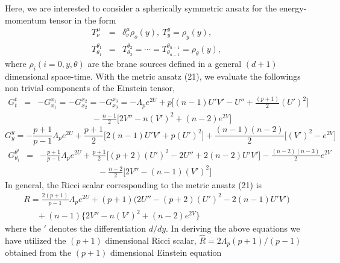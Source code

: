\documentclass[a4paper,12pt]{article}
\newcommand {\nn} {\nonumber}
\begin{document}
Here, we are interested to consider a spherically symmetric ansatz 
for the energy-momentum tensor in the form
\begin{eqnarray}
T^\mu_\nu &=& \delta^\mu_\nu\rho_o(y),~ T_y^y =\rho_y(y),~ \nn\\
T^{\theta_1}_{\theta_1} &=& T^{\theta_2}_{\theta_2} = \cdots =
T^{\theta_{n-1}}_{\theta_{n-1}} = \rho_\theta(y),
\end{eqnarray}
where $\rho_i (i=0,y,\theta)$ are the brane sources defined in a general 
$(d+1)$ dimensional space-time. With the metric ansatz (21), we evaluate the
followings non trivial components of the Einstein tensor, 
\begin{eqnarray}
G_t^t&=&-G_{x_1}^{x_1}=-G_{x_2}^{x_2}=-G_{x_3}^{x_3}
=-\Lambda_p e^{2U}+p\Big[(n-1)U'V'-U''+\frac{(p+1)}{2}(U')^2\Big]\nn\\
 && ~~~~~~~~~~~~~~~~~~~~~~~~~~~~~  
-\frac{n-1}{2}\Big[2V''-n(V')^2+(n-2)e^{2V}\Big]
\end{eqnarray}
\begin{equation}
G_y^y=-\frac{p+1}{p-1}\Lambda_p e^{2U}
+\frac{p+1}{2}\Big[2(n-1) U' V' + p (U')^2\Big] 
+\frac{(n-1)(n-2)}{2}\Big[(V')^2-e^{2V}\Big] 
\end{equation}
\begin{eqnarray}
G_{\theta_i}^{\theta^i}&=&-\frac{p+1}{p-1}\Lambda_p e^{2U}
+\frac{p+1}{2}\Big[(p+2)(U')^2-2U''+ 2(n-2)U'V'\Big]
-\frac{(n-2)(n-3)}{2}e^{2V}\nn\\
&& ~~~~~~~~~~~~~~~~~~~~~~~~~~~~~~~  -\frac{n-2}{2}\Big[2V''-(n-1)(V')^2\Big]
\end{eqnarray}
In general, the Ricci scalar corresponding to the metric ansatz (21) is
\begin{eqnarray}
R=\frac{2(p+1)}{p-1} \Lambda_p e^{2U}
+(p+1)\big(2U''-(p+2)(U')^2-2(n-1)U'V'\big)\nn\\
~~~~~~~+(n-1)\big\{2V''-n(V')^2+(n-2)e^{2V}\big\}
\end{eqnarray}
where the $'$ denotes the differentiation $d/dy$. In deriving the above
equations we have utilized the $(p+1)$ dimensional Ricci scalar,
$\hat R=2\Lambda_p(p+1)/(p-1)$ obtained from the $(p+1)$ dimensional 
Einstein equation   
\end{document}
